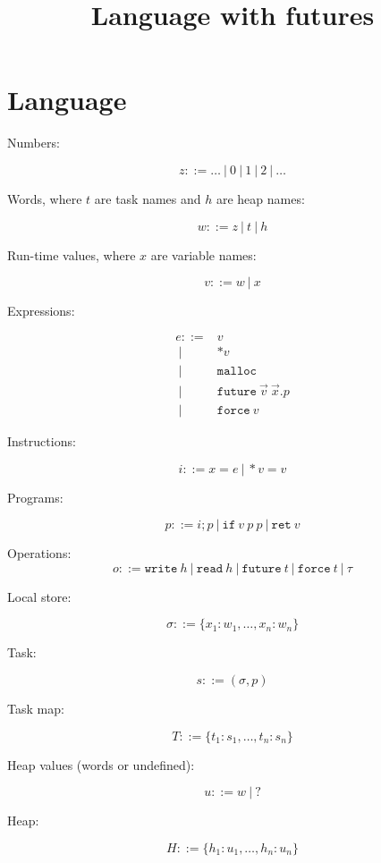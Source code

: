 \documentclass{article}
\title{Language with futures}
\date{}
\newcommand{\Prog}{p}
\newcommand{\Word}{w}
\newcommand{\Val}{v}
\newcommand{\HeapMap}{H}
\newcommand{\TaskMap}{T}
\newcommand{\Task}{s}
\newcommand{\TName}{t}
\newcommand{\HName}{h}
\newcommand{\Local}{\sigma}
\newcommand{\Inst}{i}
\newcommand{\Op}{o}
\newcommand{\Var}{x}
\newcommand{\Exp}{e}
\newcommand{\Deref}[1][\Val]{*{#1}}
\newcommand{\Store}[1][\Val]{\Deref[{#1}] = }
\newcommand{\Nat}{z}
\newcommand{\Malloc}{\mathtt{malloc}}
\newcommand{\Future}[3]{\mathtt{future}\ {#1}\ {#2}.{#3}}
\newcommand{\Force}[1][\Val]{\mathtt{force}\ {#1}}
\newcommand{\If}[3][\Val]{\mathtt{if}\ {#1}\ {#2}\ {#3}}
\newcommand{\Ret}[1][\Val]{\mathtt{ret}\ {#1}}
\newcommand{\HeapVal}{u}
\newcommand{\grmor}{|}
\newcommand{\Grmor}{\ \grmor\ }
\newcommand{\Grmeq}{::=}
\newcommand{\WRITE}[1]{\mathtt{write}\ {#1}}
\newcommand{\READ}[1]{\mathtt{read}\ {#1}}
\newcommand{\FUTURE}[1]{\mathtt{future}\ {#1}}
\newcommand{\FORCE}[1]{\mathtt{force}\ {#1}}
\newcommand{\TAU}{\tau}
\begin{document}
\maketitle

\section{Language}


Numbers:

$$
\Nat \Grmeq \dots \Grmor 0 \Grmor 1 \Grmor 2 \Grmor \dots
$$

Words, where $\TName$ are task names and $\HName$ are heap names:

$$
\Word \Grmeq \Nat \Grmor \TName \Grmor \HName
$$

Run-time values, where $\Var$ are variable names:

$$
\Val \Grmeq \Word \Grmor \Var
$$

Expressions:

$$
\begin{aligned}
\Exp    \Grmeq & \Val  \\
        \Grmor & \Deref \\
        \Grmor & \Malloc \\
        \Grmor & \Future {\vec \Val}  {\vec \Var} \Prog \\
        \Grmor & \Force 
\end{aligned}
$$

Instructions:

$$
\Inst \Grmeq \Var = \Exp \Grmor \Store \Val 
$$

Programs:

$$
\Prog \Grmeq \Inst; \Prog \Grmor \If \Prog \Prog \Grmor \Ret
$$

Operations:
$$
\Op \Grmeq \WRITE \HName \Grmor \READ \HName \Grmor \FUTURE \TName \Grmor \FORCE \TName \Grmor \TAU
$$

Local store:

$$
\sigma ::= \{\Var_1:\Word_1,\dots,\Var_n:\Word_n\}
$$

Task:

$$
\Task \Grmeq (\Local, \Prog)
$$

Task map:

$$
\TaskMap ::= \{\TName_1:\Task_1,\dots,\TName_n:\Task_n\}
$$

Heap values (words or undefined):

$$
\HeapVal \Grmeq \Word \Grmor ?
$$

Heap:

$$
\HeapMap ::= \{\HName_1\colon \HeapVal_1,\dots,\HName_n\colon \HeapVal_n\}
$$
\end{document}
